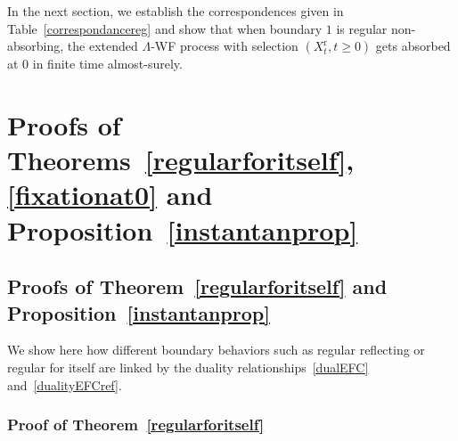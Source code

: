 \documentclass[AHL,Unicode,longabstracts,published]{cedram}
\newcommand{\rmr}{\mathrm{r}}
\begin{document}
In the next section, we establish the correspondences given in Table~\ref{correspondancereg} and show that when boundary $1$ is regular non-absorbing, the extended $\Lambda$-WF process with selection $(X_t^{\rmr},t\geq 0)$ gets absorbed at $0$ in finite time almost-surely.


\section{Proofs of Theorems~\ref{regularforitself}, \ref{fixationat0} and Proposition~\ref{instantanprop}}\label{sec3}


\subsection{Proofs of Theorem~\ref{regularforitself} and Proposition~\ref{instantanprop}}

We show here how different boundary behaviors such as regular reflecting or regular for itself are linked by the duality relationships~\eqref{dualEFC} and~\eqref{dualityEFCref}.


\subsubsection{Proof of Theorem~\ref{regularforitself}}
\end{document}
